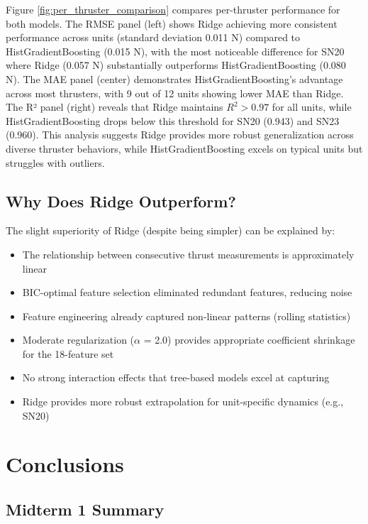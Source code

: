 \documentclass[12pt,a4paper]{article}
\begin{document}
Figure \ref{fig:per_thruster_comparison} compares per-thruster performance for both models. The RMSE panel (left) shows Ridge achieving more consistent performance across units (standard deviation 0.011 N) compared to HistGradientBoosting (0.015 N), with the most noticeable difference for SN20 where Ridge (0.057 N) substantially outperforms HistGradientBoosting (0.080 N). The MAE panel (center) demonstrates HistGradientBoosting's advantage across most thrusters, with 9 out of 12 units showing lower MAE than Ridge. The R² panel (right) reveals that Ridge maintains $R^2 > 0.97$ for all units, while HistGradientBoosting drops below this threshold for SN20 (0.943) and SN23 (0.960). This analysis suggests Ridge provides more robust generalization across diverse thruster behaviors, while HistGradientBoosting excels on typical units but struggles with outliers.

\subsection{Why Does Ridge Outperform?}

The slight superiority of Ridge (despite being simpler) can be explained by:
\begin{itemize}
    \item The relationship between consecutive thrust measurements is approximately linear
    \item BIC-optimal feature selection eliminated redundant features, reducing noise
    \item Feature engineering already captured non-linear patterns (rolling statistics)
    \item Moderate regularization ($\alpha$ = 2.0) provides appropriate coefficient shrinkage for the 18-feature set
    \item No strong interaction effects that tree-based models excel at capturing
    \item Ridge provides more robust extrapolation for unit-specific dynamics (e.g., SN20)
\end{itemize}

\newpage
\section{Conclusions}

\subsection{Midterm 1 Summary}
\end{document}
